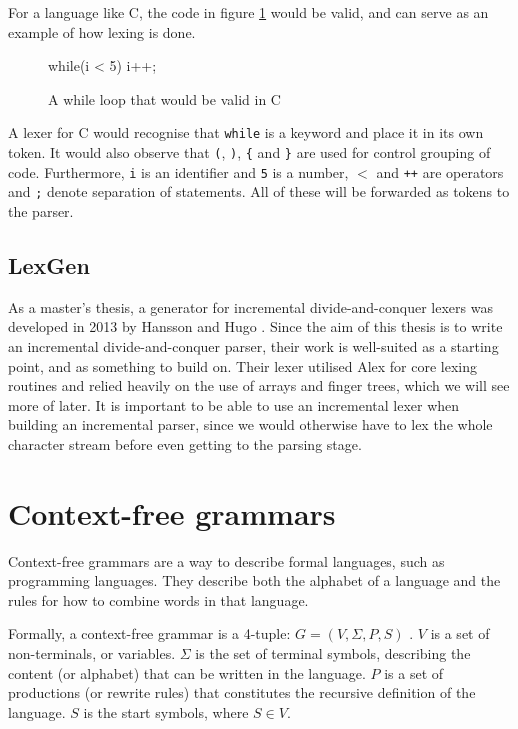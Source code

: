 \documentclass[a4paper,12pt,twosided]{report}
\begin{document}
For a language like C, the code in figure \ref{lexsample} would be valid, and
can serve as an example of how lexing is done.
\begin{figure}[H]
\begin{code}
while(i < 5) {
    i++;
}
\end{code}
\caption{A while loop that would be valid in C}
\label{lexsample}
\end{figure}
A lexer for C would recognise that \texttt{while} is a keyword and place it in
its own token. It would also observe that \texttt{(}, \texttt{)}, \texttt{\{}
and \texttt{\}} are used for control grouping of code. Furthermore, \texttt{i}
is an identifier and \texttt{5} is a number, \texttt{$<$} and \texttt{++} are
operators and \texttt{;} denote separation of statements. All of these will be
forwarded as tokens to the parser.

\subsection{LexGen}
As a master's thesis, a generator for incremental divide-and-conquer lexers was
developed in 2013 by Hansson and Hugo \cite{divconqlex}. Since the aim of this
thesis is to write an incremental divide-and-conquer parser, their work is
well-suited as a starting point, and as something to build on. Their lexer
utilised Alex for core lexing routines and relied heavily on the use of arrays
and finger trees, which we will see more of later. It is important to be able to
use an incremental lexer when building an incremental parser, since we would
otherwise have to lex the whole character stream before even getting to the
parsing stage.

\section{Context-free grammars}
Context-free grammars are a way to describe formal languages, such as
programming languages. They describe both the alphabet of a language and the
rules for how to combine words in that language.

Formally, a context-free grammar is a 4-tuple: $G = (V, \Sigma, P, S)$
\cite[p.171]{automatabook}. $V$ is a set of non-terminals, or variables. $\Sigma$ is
the set of terminal symbols, describing the content (or alphabet) that can be
written in the language.  $P$ is a set of productions (or rewrite rules) that
constitutes the recursive definition of the language. $S$ is the start symbols,
where $S \in V$. 
\end{document}
